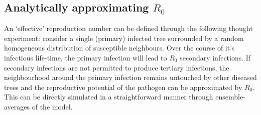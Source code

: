 \begin{fi}
\subsection{Analytically approximating $R_0$}

An `effective' reproduction number can be defined through the following thought experiment: consider a single (primary) infected tree surrounded by a random homogeneous distribution of susceptible neighbours. Over the course of it's infectious life-time, the primary infection will lead to $R_0$ secondary infections. If secondary infections are not permitted to produce tertiary infections, the neighbourhood around the primary infection remains untouched by other diseased trees and the reproductive potential of the pathogen can be approximated by $R_0$. This can be directly simulated in a straightforward manner through ensemble-averages of the model.\\


\end{fi}

